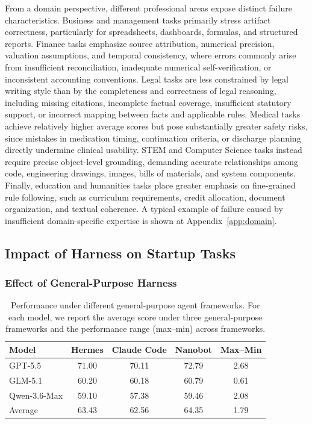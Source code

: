 From a domain perspective, different professional areas expose distinct failure characteristics. Business and management tasks primarily stress artifact correctness, particularly for spreadsheets, dashboards, formulas, and structured reports. Finance tasks emphasize source attribution, numerical precision, valuation assumptions, and temporal consistency, where errors commonly arise from insufficient reconciliation, inadequate numerical self-verification, or inconsistent accounting conventions. Legal tasks are less constrained by legal writing style than by the completeness and correctness of legal reasoning, including missing citations, incomplete factual coverage, insufficient statutory support, or incorrect mapping between facts and applicable rules. Medical tasks achieve relatively higher average scores but pose substantially greater safety risks, since mistakes in medication timing, continuation criteria, or discharge planning directly undermine clinical usability. STEM and Computer Science tasks instead require precise object-level grounding, demanding accurate relationships among code, engineering drawings, images, bills of materials, and system components. Finally, education and humanities tasks place greater emphasis on fine-grained rule following, such as curriculum requirements, credit allocation, document organization, and textual coherence. A typical example of failure caused by
insufficient domain-specific expertise is shown at Appendix~\ref{app:domain}.

\subsection{Impact of Harness on Startup Tasks}



\subsubsection{Effect of General-Purpose  Harness}
\begin{table}[t]
\centering
\small
\setlength{\tabcolsep}{7pt}
\renewcommand{\arraystretch}{1.15}
\caption{Performance under different general-purpose agent frameworks.
For each model, we report the average score under three general-purpose
frameworks and the performance range (max--min) across frameworks.}
\label{tab:harness}
\begin{tabular}{lcccc}
\toprule
\textbf{Model}
& \textbf{Hermes}
& \textbf{Claude Code}
& \textbf{Nanobot}
& \textbf{Max--Min} \\
\midrule
GPT-5.5  & 71.00 & 70.11 & 72.79 & 2.68 \\
GLM-5.1  & 60.20 & 60.18 & 60.79 & 0.61 \\
Qwen-3.6-Max & 59.10 & 57.38 & 59.46 & 2.08 \\
\midrule
Average  & 63.43 & 62.56 & 64.35 & 1.79 \\
\bottomrule
\end{tabular}
\end{table}


